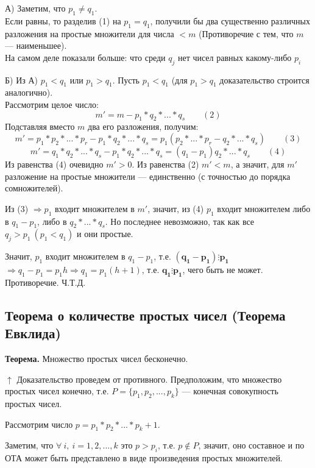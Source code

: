 \documentclass{article}
\begin{document}
            А) Заметим, что \( p_1 \neq q_1 \).\\
            Если равны, то разделив (1) на \( p_1 = q_1 \), получили бы два существенно различных разложения на простые множители для числа \( < m \) (Противоречие с тем, что \( m \) --- наименьшее).\\
            На самом деле показали больше: что среди \( q_j \) нет чисел равных какому-либо \( p_i \)

            Б) Из А) \( p_1 < q_1 \) или \( p_1 > q_1 \). Пусть \( p_1 < q_1 \) (для \( p_1 > q_1 \) доказательство строится аналогично).\\
            Рассмотрим целое число: \[ m' = m - p_1*q_2*...*q_s\qquad (2) \]
            Подставляя вместо \( m \) два его разложения, получим: \[ m' = p_1*p_2*...*p_r - p_1*q_2*...*q_s = p_1(p_2*...*p_r - q_2*...*q_s)\qquad (3) \] \[ m' = q_1*q_2*...*q_s - p_1*q_2*...*q_s = (q_1 - p_1)q_2*...*q_s\qquad (4) \]
            Из равенства (4) очевидно \( m' > 0 \). Из равенства (2) \( m' < m \), а значит, для \( m' \) разложение на простые множители --- единственно (с точностью до порядка сомножителей).

            Из (3) \( \Rightarrow p_1 \) входит множителем в \( m' \), значит, из (4) \( p_1 \) входит множителем либо в \( q_1 - p_1 \), либо в \( q_2*...*q_s \). Но последнее невозможно, так как все \( q_j > p_1\ (p_1 < q_1) \) и они простые.

            Значит, \( p_1 \) входит множителем в \( q_1 - p_1 \), т.е. \( \mathbf{(q_1 - p_1) \vdots p_1} \) \( \Rightarrow q_1 - p_1 = p_1h \Rightarrow q_1 = p_1(h + 1) \), т.е. \( \mathbf{q_1 \vdots p_1} \), чего быть не может. Противоречие. Ч.Т.Д.
            
        \subsection{Теорема о количестве простых чисел (Теорема Евклида)}
            \textbf{Теорема.} Множество простых чисел бесконечно.

            \( \uparrow \) Доказательство проведем от противного. Предположим, что множество простых чисел конечно, т.е. \( P=\{p_1,p_2,...,p_k\} \) --- конечная совокупность простых чисел.

            Рассмотрим число \( p = p_1*p_2*...*p_k + 1 \).

            Заметим, что \( \forall\ i,\ i=1,2,...,k \) это \( p > p_i \), т.е. \( p \notin P \), значит, оно составное и по ОТА может быть представлено в виде произведения простых множителей.
\end{document}

